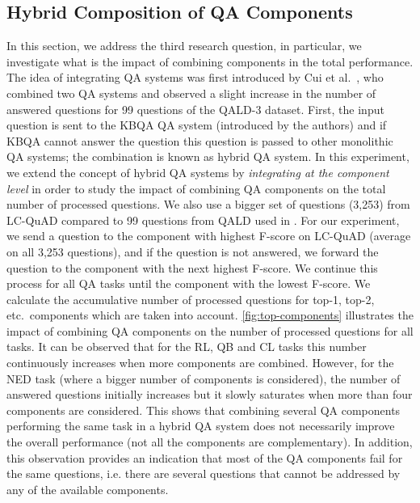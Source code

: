 \documentclass[sigconf,edbt]{acmart-edbt2019}
\begin{document}
\subsection{Hybrid Composition of QA Components} \label{sec:hybrid}
In this section, we address the third research question, in particular, we investigate what is the impact of combining components in the total performance.
The idea of integrating QA systems was first introduced by Cui et al.~\cite{DBLP:journals/pvldb/CuiXWSHW17}, who combined two QA systems and observed a slight increase in the number of answered questions for 99 questions of the QALD-3 dataset. First, the input question is sent to the KBQA QA system (introduced by the authors) and if KBQA cannot answer the question this question is passed to other monolithic QA systems; the combination is known as hybrid QA system. 
In this experiment, we extend the concept of hybrid QA systems by \textit{integrating at the component level} in order to study the impact of combining QA components on the total number of processed questions. We also use a bigger set of questions (3,253) from LC-QuAD compared to 99 questions from QALD used in \cite{DBLP:journals/pvldb/CuiXWSHW17}. For our experiment, we send a question to the component with highest F-score on LC-QuAD (average on all 3,253 questions), and if the question is not answered, we forward the question to the component with the next highest F-score. We continue this process for all QA tasks until the component with the lowest F-score.
We calculate the accumulative number of processed questions for top-1, top-2, etc.\ components which are taken into account.
\autoref{fig:top-components} illustrates the impact of combining QA components on the number of processed questions for all tasks. It can be observed that for the RL, QB and CL tasks this number continuously increases when more components are combined. However, for the NED task (where a bigger number of components is considered), the number of answered questions initially increases but it slowly saturates when more than four components are considered. This shows that combining several QA components performing the same task in a hybrid QA system does not necessarily improve the overall performance (not all the components are complementary). In addition, this observation provides an indication that most of the QA components fail for the same questions, i.e. there are several questions that cannot be addressed by any of the available components.
\end{document}
